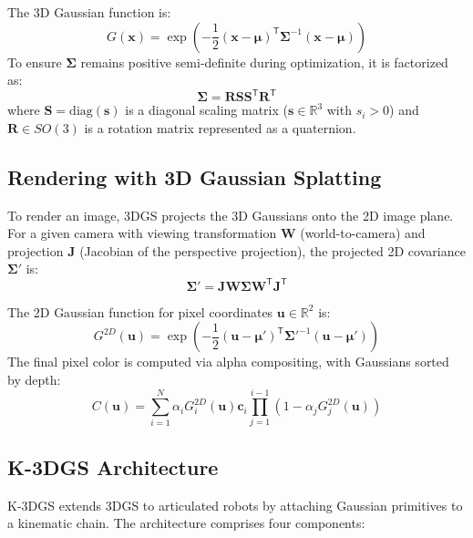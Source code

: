\documentclass[12pt,a4paper,oneside]{report}
\begin{document}
The 3D Gaussian function is:
\begin{equation}
G(\mathbf{x}) = \exp\left(-\frac{1}{2} (\mathbf{x} - \boldsymbol{\mu})^\mathsf{T} \boldsymbol{\Sigma}^{-1} (\mathbf{x} - \boldsymbol{\mu})\right)
\end{equation}
To ensure $\boldsymbol{\Sigma}$ remains positive semi-definite during optimization, it is factorized as:
\begin{equation}
\boldsymbol{\Sigma} = \mathbf{R} \mathbf{S} \mathbf{S}^\mathsf{T} \mathbf{R}^\mathsf{T}
\end{equation}
where $\mathbf{S} = \text{diag}(\mathbf{s})$ is a diagonal scaling matrix ($\mathbf{s} \in \mathbb{R}^3$ with $s_i > 0$) and $\mathbf{R} \in SO(3)$ is a rotation matrix represented as a quaternion.

\subsection{Rendering with 3D Gaussian Splatting}
To render an image, 3DGS projects the 3D Gaussians onto the 2D image plane. For a given camera with viewing transformation $\mathbf{W}$ (world-to-camera) and projection $\mathbf{J}$ (Jacobian of the perspective projection), the projected 2D covariance $\boldsymbol{\Sigma}'$ is:
\begin{equation}
\boldsymbol{\Sigma}' = \mathbf{J} \mathbf{W} \boldsymbol{\Sigma} \mathbf{W}^\mathsf{T} \mathbf{J}^\mathsf{T}
\end{equation}

The 2D Gaussian function for pixel coordinates $\mathbf{u} \in \mathbb{R}^2$ is:
\begin{equation}
G^{2D}(\mathbf{u}) = \exp\left(-\frac{1}{2} (\mathbf{u} - \boldsymbol{\mu}')^\mathsf{T} \boldsymbol{\Sigma}'^{-1} (\mathbf{u} - \boldsymbol{\mu}')\right)
\end{equation}
The final pixel color is computed via alpha compositing, with Gaussians sorted by depth:
\begin{equation}
C(\mathbf{u}) = \sum_{i=1}^{N} \alpha_i G_i^{2D}(\mathbf{u}) \mathbf{c}_i \prod_{j=1}^{i-1} (1 - \alpha_j G_j^{2D}(\mathbf{u}))
\end{equation}

\subsection{K-3DGS Architecture}
K-3DGS extends 3DGS to articulated robots by attaching Gaussian primitives to a kinematic chain. The architecture comprises four components:
\end{document}

